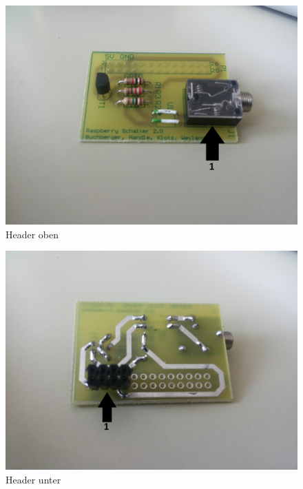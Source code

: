 \begin{figure}[H]
\centering
\includegraphics[keepaspectratio=true, width=13cm]{images/rpi/rpi_header_top.jpg}
\caption{Header oben}
\label{fig:report_hardware_heTo}
\end{figure}
\begin{figure}[H]
\centering
\includegraphics[keepaspectratio=true, width=13cm]{images/rpi/rpi_header_bottom.jpg}
\caption{Header unter}
\label{fig:report_hardware_heBo}
\end{figure}
